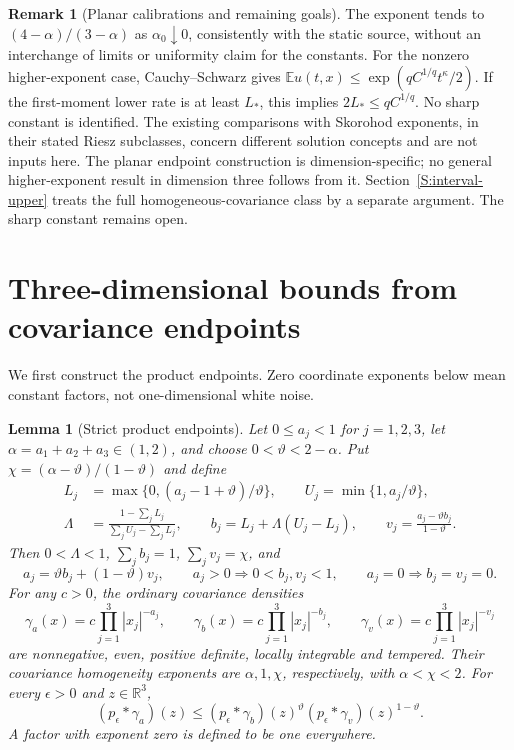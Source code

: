 \documentclass[12pt]{article}
\numberwithin{equation}{section}
\newtheorem{lemma}[theorem]{Lemma}
\theoremstyle{definition}
\newtheorem{remark}[theorem]{Remark}
\newcommand{\R}{\mathbb{R}}
\newcommand{\E}{\mathbb{E}}
\begin{document}
\begin{remark}[Planar calibrations and remaining goals]\label{R:planar-scope}
  The exponent tends to $(4-\alpha)/(3-\alpha)$ as
  $\alpha_0\downarrow0$, consistently with the static source, without
  an interchange of limits or uniformity claim for the constants.
  For the nonzero higher-exponent case, Cauchy--Schwarz gives
  $\E u(t,x)\le\exp(qC^{1/q}t^\kappa/2)$.
  If the first-moment lower rate is at least $L_*$, this implies
  $2L_*\le qC^{1/q}$. No sharp constant is identified. The existing
  comparisons with Skorohod exponents, in their stated Riesz subclasses,
  concern different solution concepts and are not inputs here. The planar
  endpoint construction
  is dimension-specific; no general higher-exponent result in dimension
  three follows from it. Section~\ref{S:interval-upper} treats the full
  homogeneous-covariance class by a separate argument. The sharp
  constant remains open.
\end{remark}

\section{Three-dimensional bounds from covariance endpoints}
\label{S:three-endpoints}


We first construct the product endpoints. Zero coordinate exponents below
mean constant factors, not one-dimensional white noise.

\begin{lemma}[Strict product endpoints]\label{L:product-endpoints}
  Let $0\le a_j<1$ for $j=1,2,3$, let
  $\alpha=a_1+a_2+a_3\in(1,2)$, and choose $0<\vartheta<2-\alpha$.
  Put $\chi=(\alpha-\vartheta)/(1-\vartheta)$ and define
  \begin{equation}\label{E:product-endpoint-vectors}
    \begin{split}
      L_j&=\max\{0,(a_j-1+\vartheta)/\vartheta\},\qquad
      U_j=\min\{1,a_j/\vartheta\},\\
      \Lambda&=\frac{1-\sum_jL_j}{\sum_jU_j-\sum_jL_j},\qquad
      b_j=L_j+\Lambda(U_j-L_j),\qquad
      v_j=\frac{a_j-\vartheta b_j}{1-\vartheta}.
    \end{split}
  \end{equation}
  Then $0<\Lambda<1$, $\sum_j b_j=1$, $\sum_jv_j=\chi$, and
  \[
    a_j=\vartheta b_j+(1-\vartheta)v_j,\qquad
    a_j>0\Longrightarrow 0<b_j,v_j<1,\qquad
    a_j=0\Longrightarrow b_j=v_j=0.
  \]
  For any $c>0$, the ordinary covariance densities
  \[
    \gamma_a(x)=c\prod_{j=1}^3|x_j|^{-a_j},\qquad
    \gamma_b(x)=c\prod_{j=1}^3|x_j|^{-b_j},\qquad
    \gamma_v(x)=c\prod_{j=1}^3|x_j|^{-v_j}
  \]
  are nonnegative, even, positive definite, locally integrable and
  tempered. Their covariance homogeneity exponents are $\alpha,1,\chi$,
  respectively, with $\alpha<\chi<2$. For every $\epsilon>0$ and
  $z\in\R^3$,
  \begin{equation}\label{E:product-gaussian-comparison}
    (p_\epsilon*\gamma_a)(z)
    \le(p_\epsilon*\gamma_b)(z)^\vartheta
    (p_\epsilon*\gamma_v)(z)^{1-\vartheta}.
  \end{equation}
  A factor with exponent zero is defined to be one everywhere.
\end{lemma}
\end{document}
